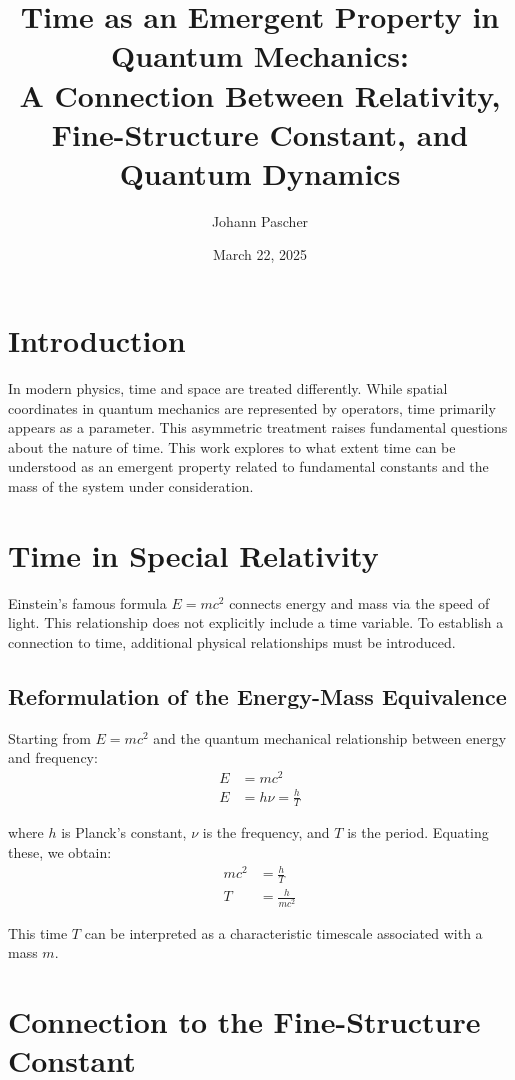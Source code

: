 \documentclass{article}
\title{Time as an Emergent Property in Quantum Mechanics: \\A Connection Between Relativity, Fine-Structure Constant, and Quantum Dynamics}
\author{Johann Pascher}
\date{March 22, 2025}
\begin{document}
	
	\maketitle
	
	\section{Introduction}
	
	In modern physics, time and space are treated differently. While spatial coordinates in quantum mechanics are represented by operators, time primarily appears as a parameter. This asymmetric treatment raises fundamental questions about the nature of time. This work explores to what extent time can be understood as an emergent property related to fundamental constants and the mass of the system under consideration.
	
	\tableofcontents
	
	\section{Time in Special Relativity}
	
	Einstein's famous formula $E = mc^2$ connects energy and mass via the speed of light. This relationship does not explicitly include a time variable. To establish a connection to time, additional physical relationships must be introduced.
	
	\subsection{Reformulation of the Energy-Mass Equivalence}
	
	Starting from $E = mc^2$ and the quantum mechanical relationship between energy and frequency:
	\begin{align}
		E &= mc^2 \\
		E &= h\nu = \frac{h}{T}
	\end{align}
	
	where $h$ is Planck's constant, $\nu$ is the frequency, and $T$ is the period. Equating these, we obtain:
	\begin{align}
		mc^2 &= \frac{h}{T} \\
		T &= \frac{h}{mc^2}
	\end{align}
	
	This time $T$ can be interpreted as a characteristic timescale associated with a mass $m$.
	
	\section{Connection to the Fine-Structure Constant}
	
\end{document}
